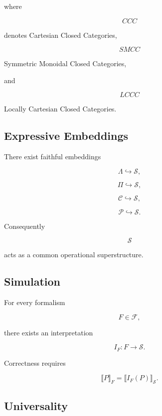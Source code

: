 \documentclass[12pt,oneside]{article}
\theoremstyle{definition}
\theoremstyle{remark}
\begin{document}
where

\[
CCC
\]

denotes Cartesian Closed Categories,

\[
SMCC
\]

Symmetric Monoidal Closed Categories,

and

\[
LCCC
\]

Locally Cartesian Closed Categories.

\subsection*{Expressive Embeddings}

There exist faithful embeddings

\[
\Lambda
\hookrightarrow
\mathcal S,
\]

\[
\Pi
\hookrightarrow
\mathcal S,
\]

\[
\mathcal C
\hookrightarrow
\mathcal S,
\]

\[
\mathcal P
\hookrightarrow
\mathcal S.
\]

Consequently

\[
\mathcal S
\]

acts as a common operational superstructure.

\subsection*{Simulation}

For every formalism

\[
F
\in
\mathcal F,
\]

there exists an interpretation

\[
I_F
:
F
\rightarrow
\mathcal S.
\]

Correctness requires

\[
\llbracket
P
\rrbracket_F
=
\llbracket
I_F(P)
\rrbracket_{\mathcal S}.
\]

\subsection*{Universality}
\end{document}

